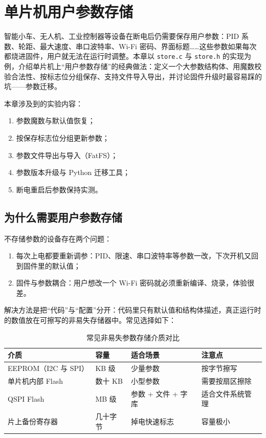 \chapter{单片机用户参数存储} \label{ch:param-store}

智能小车、无人机、工业控制器等设备在断电后仍需要保存用户参数：PID 系数、轮距、最大速度、串口波特率、Wi-Fi 密码、界面标题……这些参数如果每次都烧进固件，用户就无法在运行时调整。本章以 \texttt{store.c} 与 \texttt{store.h} 的实现为例，介绍单片机上“用户参数存储”的经典做法：定义一个大参数结构体、用魔数校验合法性、按标志位分组保存、支持文件导入导出，并讨论固件升级时最容易踩的坑——参数迁移。

\medskip 本章涉及到的实验内容：
\begin{enumerate}
\item 参数魔数与默认值恢复；
\item 按保存标志位分组更新参数；
\item 参数文件导出与导入（FatFS）；
\item 参数版本升级与 Python 迁移工具；
\item 断电重启后参数保持实测。
\end{enumerate}

\section{为什么需要用户参数存储}

不存储参数的设备存在两个问题：

\begin{enumerate}
\item 每次上电都要重新调参：PID、限速、串口波特率等参数一改，下次开机又回到固件里的默认值；
\item 固件与参数耦合：用户想改一个 Wi-Fi 密码就必须重新编译、烧录，体验很差。
\end{enumerate}

解决方法是把“代码”与“配置”分开：代码里只有默认值和结构体描述，真正运行时的数值放在可擦写的非易失存储器中。常见选择如下：

\begin{table}[htbp]
\centering \caption{常见非易失参数存储介质对比} \label{tab:param-media}
    \begin{tabular}{llll}
        \toprule
        介质 & 容量 & 适合场景 & 注意点 \\
        \midrule
        EEPROM（I2C 与 SPI） & KB 级 & 少量参数 & 按字节擦写 \\
        单片机内部 Flash & 数十 KB & 小型参数 & 需要按扇区擦除 \\
        QSPI Flash & MB 级 & 参数 + 文件 + 字库 & 适合文件系统管理 \\
        片上备份寄存器 & 几十字节 & 掉电快速标志 & 容量极小 \\
        \bottomrule
    \end{tabular}
\end{table}

